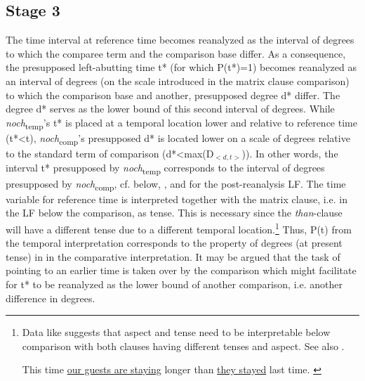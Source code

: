 \documentclass[output=paper,
modfonts
]{langscibook}
\begin{document}
\subsection{Stage 3} The time interval at reference time becomes reanalyzed as the interval of degrees to which the comparee term and the comparison base differ. As a consequence, the presupposed left-abutting time t* (for which P(t*)=1) becomes reanalyzed as an interval of degrees (on the scale introduced in the matrix clause comparison) to which the comparison base and another, presupposed degree d* differ. The degree d* serves as the lower bound of this second interval of degrees. While \textit{noch}\textsubscript{temp}'s t* is placed at a temporal location lower and relative to reference time (t*<t), \textit{noch}\textsubscript{comp}'s presupposed d* is located lower on a scale of degrees relative to the standard term of comparison (d*<max(D$_{<d,t>}$)). In other words, the interval t* presupposed by \textit{noch}\textsubscript{temp} corresponds to the interval of degrees presupposed by \textit{noch}\textsubscript{comp}, cf. below, , and  for the post-reanalysis LF. The time variable for reference time is interpreted together with the matrix clause, i.e. in the LF below the comparison, as tense. This is necessary since the \textit{than}-clause will have a different tense due to a different temporal location.\footnote{Data like  suggests that aspect and tense need to be interpretable below comparison with both clauses having different tenses and aspect. See also \citep{stechow2006}.

\ea This time \underline{our guests are staying} longer than \underline{they stayed} last time. \label{tense_and_aspect_example}\z} Thus, P(t) from the temporal interpretation corresponds to the property of degrees (at present tense) in  in the comparative interpretation. 
It may be argued that the task of pointing to an earlier time is taken over by the comparison which might facilitate for t* to be reanalyzed as the lower bound of another comparison, i.e. another difference in degrees. 
\end{document}
